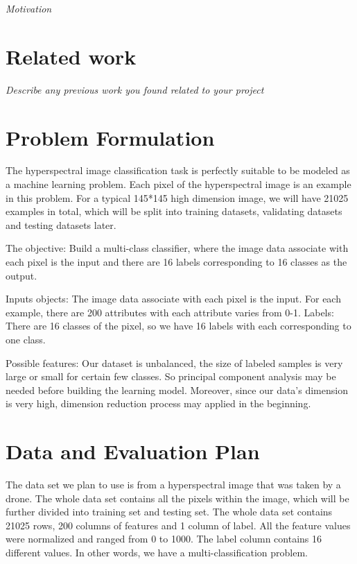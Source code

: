 \documentclass[11pt]{article}
\begin{document}
\textit{Motivation}

\section{Related work}
\textit{Describe any previous work you found related to your project}

\section{Problem Formulation}
The hyperspectral image classification task is perfectly suitable to be modeled as a machine learning  problem. Each pixel of the hyperspectral image is an example in this problem.  For a typical 145*145 high dimension image, we will have 21025 examples in total, which will be split into training datasets, validating datasets and testing datasets later.

The objective:  Build a multi-class classifier, where the image data associate with each pixel is the input and  there are 16 labels corresponding to 16 classes as the output. 

Inputs objects:  The image data associate with each pixel is the input. For each example, there are 200 attributes with each attribute varies from 0-1.
Labels:  There are 16 classes of the pixel, so we have 16 labels with each corresponding to one class.

Possible features:  Our dataset is unbalanced, the size of labeled samples is very large or  small for certain few classes.  So principal component analysis may be needed before building the learning model. Moreover,  since our data's dimension is very high, dimension reduction process may applied in the beginning.

\section{Data and Evaluation Plan}

The data set we plan to use is from a hyperspectral image that was taken by a drone. The whole data set contains all the pixels within the image, which will be further divided into training set and testing set. The whole data set contains 21025 rows, 200 columns of features and 1 column of label. All the feature values were normalized and ranged from 0 to 1000. The label column contains 16 different values. In other words, we have a multi-classification problem.
\end{document}

